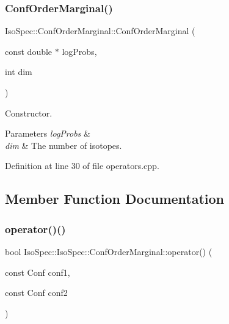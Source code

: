 \subsubsection{\texorpdfstring{Conf\+Order\+Marginal()}{ConfOrderMarginal()}}
{\footnotesize\ttfamily Iso\+Spec\+::\+Conf\+Order\+Marginal\+::\+Conf\+Order\+Marginal (\begin{DoxyParamCaption}\item[{const double $\ast$}]{log\+Probs,  }\item[{int}]{dim }\end{DoxyParamCaption})}



Constructor. 


\begin{DoxyParams}{Parameters}
{\em log\+Probs} & \\
\hline
{\em dim} & The number of isotopes. \\
\hline
\end{DoxyParams}


Definition at line 30 of file operators.\+cpp.



\subsection{Member Function Documentation}
\mbox{\label{class_iso_spec_1_1_iso_spec_1_1_conf_order_marginal_a617a19a4c112750abde2153276c90612}} 
\subsubsection{\texorpdfstring{operator()()}{operator()()}}
{\footnotesize\ttfamily bool Iso\+Spec\+::\+Iso\+Spec\+::\+Conf\+Order\+Marginal\+::operator() (\begin{DoxyParamCaption}\item[{const Conf}]{conf1,  }\item[{const Conf}]{conf2 }\end{DoxyParamCaption})\hspace{0.3cm}{\ttfamily [inline]}}



